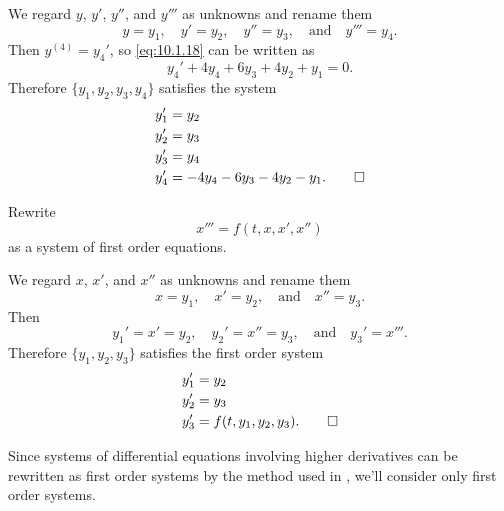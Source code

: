 \begin{solution}
We regard $y$, $y'$, $y''$, and $y'''$  as unknowns and rename them
\[
y=y_1,\quad y'=y_2,\quad y''=y_3,\quad\text{and}\quad  y'''=y_4.
\]
Then $y^{(4)}=y_4'$, so \eqref{eq:10.1.18} can be written as
\[
y_4'+4y_4+6y_3+4y_2+y_1=0.
\]
Therefore $\{y_1,y_2,y_3,y_4\}$ satisfies the system
\begin{align*}
y_1'&=y_2\\
y_2'&=y_3 \\
y_3'&=y_4\\
y_4'&=-4y_4-6y_3-4y_2-y_1.\qedhere
\end{align*}
\end{solution}

\begin{example}\label{example:10.1.7}
 Rewrite
\[
x'''=f(t,x,x',x'')
\]
as a system of first order equations.
\end{example}

\begin{solution}
We regard $x$, $x'$, and $x''$ as unknowns and rename them
\[
x=y_1, \quad x'=y_2,\quad\text{and}\quad  x''=y_3.
\]
Then
\[
y_1'=x'=y_2,\quad y_2'=x''=y_3,\quad\text{and}\quad  y_3'=x'''.
\]
Therefore $\{y_1,y_2,y_3\}$ satisfies the first order system
\begin{align*}
y_1'&=y_2\\
y_2'&=y_3\\
y_3'&=f(t,y_1,y_2,y_3).\qedhere
\end{align*}
\end{solution}

Since systems of differential equations involving higher derivatives
can be rewritten as first order systems by the method used in
 , we'll consider only first
order systems.




